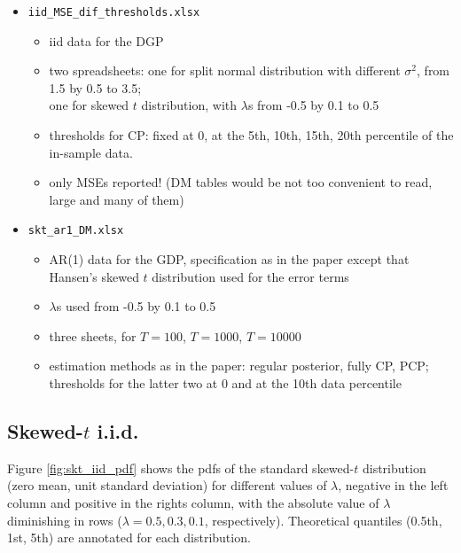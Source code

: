 \documentclass[a4paper,10pt]{article} %
\begin{document}
\begin{itemize}
\begin{itemize}
\item \texttt{iid\_MSE\_dif\_thresholds.xlsx}
\begin{itemize}
\item  iid data for the DGP 
\item  two spreadsheets:
one for split normal distribution with different $\sigma^2$, from 1.5 by 0.5 to 3.5;\\
one for skewed $t$ distribution, with $\lambda$s  from -0.5 by 0.1 to 0.5
\item  thresholds for CP: fixed at 0, at the 5th, 10th, 15th, 20th percentile of the in-sample data.
\item only MSEs reported! (DM tables would be not too convenient to read, large and many of them)
\end{itemize}

\item \texttt{skt\_ar1\_DM.xlsx}
\begin{itemize}
\item AR(1) data for the GDP, specification as in the paper
except that Hansen's skewed $t$ distribution used for the error terms
\item $\lambda$s used from -0.5 by 0.1 to 0.5
\item  three sheets, for $T=100$, $T=1000$, $T=10000$
\item  estimation methods as in the paper: regular posterior, fully CP, PCP;\\
thresholds for the latter two at 0 and at the 10th data percentile
\end{itemize}

\end{itemize}

\end{itemize}

\subsection{Skewed-$t$ i.i.d.}
Figure \ref{fig:skt_iid_pdf} shows the pdfs of the standard skewed-$t$ distribution  (zero mean, unit standard deviation) for different values of $\lambda$, negative in the left column and positive in the rights column, with the absolute value of $\lambda$ diminishing in rows ($\lambda=0.5,0.3,0.1$, respectively).  Theoretical quantiles (0.5th, 1st, 5th) are annotated for each  distribution.
\end{document}
